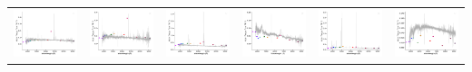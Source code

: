 \begin{center}
\begin{longtable}{l l l l l l }
    \includegraphics[width=0.3\linewidth, clip]{Figs/Figs-sdss/spec-1558-53271-0059-STRIPE82-0053-022298.pdf} & \includegraphics[width=0.3\linewidth, clip]{Figs/Figs-sdss/spec-1829-53494-0276-SPLUS-n05n53-037456.pdf} & \includegraphics[width=0.3\linewidth, clip]{Figs/Figs-sdss/spec-1829-53494-0282-SPLUS-n05n53-005761.pdf} & \includegraphics[width=0.3\linewidth, clip]{Figs/Figs-sdss/spec-1901-53261-0086-SPLUS-s02s13-032892.pdf} & \includegraphics[width=0.3\linewidth, clip]{Figs/Figs-sdss/spec-1919-53240-0073-STRIPE82-0111-068928.pdf} & \includegraphics[width=0.3\linewidth, clip]{Figs/Figs-sdss/spec-1919-53240-0621-STRIPE82-0112-020655.pdf} \\

\end{longtable}
\end{center}
